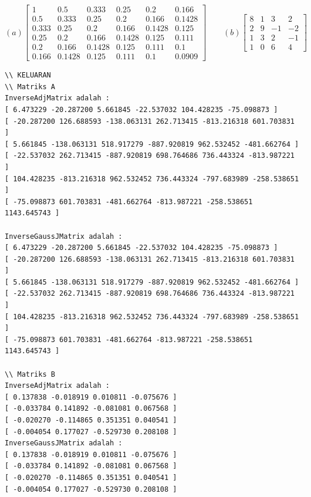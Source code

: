 \[(a) \begin{bmatrix}
1     & 0.5    & 0.333  & 0.25   & 0.2    & 0.166 \\
0.5   & 0.333  & 0.25   & 0.2    & 0.166  & 0.1428 \\
0.333 & 0.25   & 0.2    & 0.166  & 0.1428 & 0.125 \\
0.25  & 0.2    & 0.166  & 0.1428 & 0.125  & 0.111 \\
0.2   & 0.166  & 0.1428 & 0.125  & 0.111  & 0.1 \\
0.166 & 0.1428 & 0.125  & 0.111  & 0.1    & 0.0909 
\end{bmatrix} \qquad (b)
\begin{bmatrix}
8  & 1 & 3  & 2 \\
2  & 9 & -1 &  -2 \\
1  & 3 & 2  & -1 \\
1  & 0 & 6  & 4 
\end{bmatrix}
\]

\begin{lstlisting}
\\ KELUARAN
\\ Matriks A
InverseAdjMatrix adalah : 
[ 6.473229 -20.287200 5.661845 -22.537032 104.428235 -75.098873 ]
[ -20.287200 126.688593 -138.063131 262.713415 -813.216318 601.703831 ]
[ 5.661845 -138.063131 518.917279 -887.920819 962.532452 -481.662764 ]
[ -22.537032 262.713415 -887.920819 698.764686 736.443324 -813.987221 ]
[ 104.428235 -813.216318 962.532452 736.443324 -797.683989 -258.538651 ]
[ -75.098873 601.703831 -481.662764 -813.987221 -258.538651 1143.645743 ]

InverseGaussJMatrix adalah : 
[ 6.473229 -20.287200 5.661845 -22.537032 104.428235 -75.098873 ]
[ -20.287200 126.688593 -138.063131 262.713415 -813.216318 601.703831 ]
[ 5.661845 -138.063131 518.917279 -887.920819 962.532452 -481.662764 ]
[ -22.537032 262.713415 -887.920819 698.764686 736.443324 -813.987221 ]
[ 104.428235 -813.216318 962.532452 736.443324 -797.683989 -258.538651 ]
[ -75.098873 601.703831 -481.662764 -813.987221 -258.538651 1143.645743 ]

\\ Matriks B
InverseAdjMatrix adalah : 
[ 0.137838 -0.018919 0.010811 -0.075676 ]
[ -0.033784 0.141892 -0.081081 0.067568 ]
[ -0.020270 -0.114865 0.351351 0.040541 ]
[ -0.004054 0.177027 -0.529730 0.208108 ]
InverseGaussJMatrix adalah : 
[ 0.137838 -0.018919 0.010811 -0.075676 ]
[ -0.033784 0.141892 -0.081081 0.067568 ]
[ -0.020270 -0.114865 0.351351 0.040541 ]
[ -0.004054 0.177027 -0.529730 0.208108 ]\end{lstlisting}
\pagebreak

